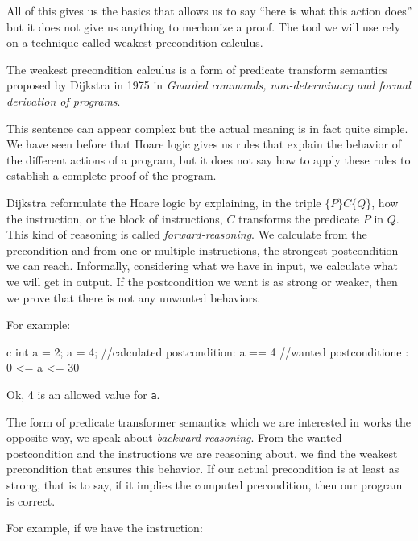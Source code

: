 \documentclass[middle]{zmdocument}
\begin{document}
All of this gives us the basics that allows us to say ``here is what
this action does'' but it does not give us anything to mechanize a
proof. The tool we will use rely on a technique called weakest
precondition calculus.





The weakest precondition calculus is a form of predicate transform
semantics proposed by Dijkstra in 1975 in \emph{Guarded commands,
non-determinacy and formal derivation of programs}.

This sentence can appear complex but the actual meaning is in fact quite
simple. We have seen before that Hoare logic gives us rules that explain
the behavior of the different actions of a program, but it does not say
how to apply these rules to establish a complete proof of the program.

Dijkstra reformulate the Hoare logic by explaining, in the triple
$\{P\}C\{Q\}$, how the instruction, or the block of instructions,
$C$ transforms the predicate $P$ in $Q$. This kind of reasoning is
called \emph{forward-reasoning}. We calculate from the precondition and
from one or multiple instructions, the strongest postcondition we can
reach. Informally, considering what we have in input, we calculate what
we will get in output. If the postcondition we want is as strong or
weaker, then we prove that there is not any unwanted behaviors.



For example:



\begin{CodeBlock}{c}
int a = 2;
a = 4;
//calculated postcondition: a == 4
//wanted postconditione   : 0 <= a <= 30
\end{CodeBlock}



Ok, 4 is an allowed value for \texttt{a}.



The form of predicate transformer semantics which we are interested in
works the opposite way, we speak about \emph{backward-reasoning}. From
the wanted postcondition and the instructions we are reasoning about, we
find the weakest precondition that ensures this behavior. If our actual
precondition is at least as strong, that is to say, if it implies the
computed precondition, then our program is correct.



For example, if we have the instruction:
\end{document}
